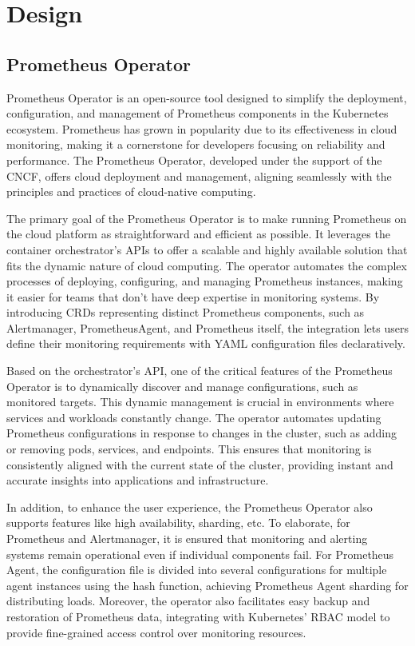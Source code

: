 
\chapter{Design}\label{chapter:design}

\section{Prometheus Operator}

Prometheus Operator is an open-source tool designed to simplify the deployment, configuration, and management of Prometheus components in the Kubernetes ecosystem. Prometheus has grown in popularity due to its effectiveness in cloud monitoring, making it a cornerstone for developers focusing on reliability and performance. The Prometheus Operator, developed under the support of the \ac{CNCF}, offers cloud deployment and management, aligning seamlessly with the principles and practices of cloud-native computing. 

The primary goal of the Prometheus Operator is to make running Prometheus on the cloud platform as straightforward and efficient as possible. It leverages the container orchestrator's \ac{API}s to offer a scalable and highly available solution that fits the dynamic nature of cloud computing. The operator automates the complex processes of deploying, configuring, and managing Prometheus instances, making it easier for teams that don't have deep expertise in monitoring systems. By introducing \ac{CRD}s representing distinct Prometheus components, such as Alertmanager, PrometheusAgent, and Prometheus itself, the integration lets users define their monitoring requirements with YAML configuration files declaratively. 

Based on the orchestrator's \ac{API}, one of the critical features of the Prometheus Operator is to dynamically discover and manage configurations, such as monitored targets. This dynamic management is crucial in environments where services and workloads constantly change. The operator automates updating Prometheus configurations in response to changes in the cluster, such as adding or removing pods, services, and endpoints. This ensures that monitoring is consistently aligned with the current state of the cluster, providing instant and accurate insights into applications and infrastructure. 

In addition, to enhance the user experience, the Prometheus Operator also supports features like high availability, sharding, etc. To elaborate, for Prometheus and Alertmanager, it is ensured that monitoring and alerting systems remain operational even if individual components fail. For Prometheus Agent, the configuration file is divided into several configurations for multiple agent instances using the hash function, achieving Prometheus Agent sharding for distributing loads. Moreover, the operator also facilitates easy backup and restoration of Prometheus data, integrating with Kubernetes' RBAC model to provide fine-grained access control over monitoring resources. 

